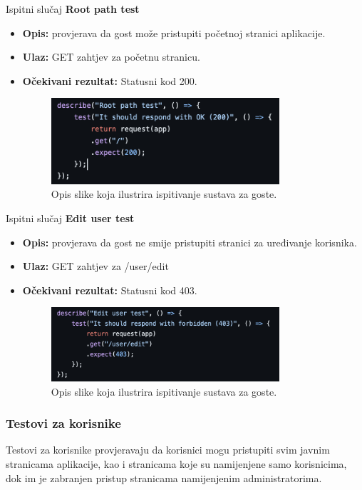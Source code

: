 			Ispitni slučaj \textbf{Root path test}
			\begin{itemize}
				\item \textbf{Opis:} provjerava da gost može pristupiti početnoj stranici aplikacije.
				\item \textbf{Ulaz:} GET zahtjev za početnu stranicu.
				\item \textbf{Očekivani rezultat:} Statusni kod 200.
				\begin{figure}[h]
					\centering
					\includegraphics[width=0.8\textwidth]{slike/testovi/guest_root_test.png}
					\caption{Opis slike koja ilustrira ispitivanje sustava za goste.}
					\label{fig:testovi_gosti_slika}
				\end{figure}
			\end{itemize}

			Ispitni slučaj \textbf{Edit user test}
			\begin{itemize}
				\item \textbf{Opis:} provjerava da gost ne smije pristupiti stranici za uređivanje korisnika.
				\item \textbf{Ulaz:} GET zahtjev za /user/edit
				\item \textbf{Očekivani rezultat:} Statusni kod 403.
				\begin{figure}[h]
					\centering
					\includegraphics[width=0.8\textwidth]{slike/testovi/guest_edit_profile_test.png}
					\caption{Opis slike koja ilustrira ispitivanje sustava za goste.}
					\label{fig:testovi_gosti_slika}
				\end{figure}
			\end{itemize}
			\newpage
			
			\subsubsection{Testovi za korisnike}
			Testovi za korisnike provjeravaju da korisnici mogu pristupiti svim javnim stranicama aplikacije,
			kao i stranicama koje su namijenjene samo korisnicima,
			dok im je zabranjen pristup stranicama namijenjenim administratorima.
			\\

